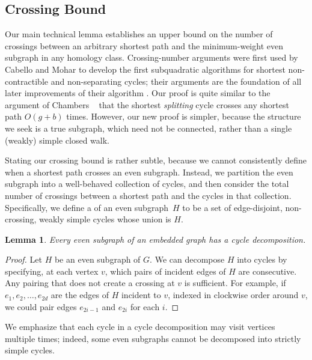 \documentclass{sig-alternate}
\def\note#1{\EMPH{\color{red} #1}}
\newtheorem{lemma}[theorem]{Lemma}
\begin{document}
\subsection{Crossing Bound}

Our main technical lemma establishes an upper bound on the number of crossings between an arbitrary shortest path and the minimum-weight even subgraph in any homology class.  Crossing-number arguments were first used by Cabello and Mohar \cite{cm-fsnsn-07} to develop the first subquadratic algorithms for shortest non-contractible and non-separating cycles; their arguments are the foundation of all later improvements of their algorithm \cite{c-mdpg-06, k-csnco-06, cc-msspg-07}.  Our proof is quite similar to the argument of Chambers \etal~\cite{ccelw-scsih-08} that the shortest \emph{splitting} cycle crosses any shortest path $O(g+b)$ times.  However, our new proof is simpler, because the structure we seek is a true subgraph, which need not be connected, rather than a single (weakly) simple closed walk.

Stating our crossing bound is rather subtle, because we cannot consistently define when a shortest path crosses an even subgraph.  Instead, we partition the even subgraph into a well-behaved collection of cycles, and then consider the total number of crossings between a shortest path and the cycles in that collection.  Specifically, we define a  of an even subgraph~$H$ to be a set of edge-disjoint, non-crossing, weakly simple cycles whose union is $H$.

\begin{lemma}
Every even subgraph of an embedded graph has a cycle decomposition.
\end{lemma}

\begin{proof}
Let $H$ be an even subgraph of $G$.  We can decompose $H$ into cycles by specifying, at each vertex $v$, which pairs of incident edges of $H$ are consecutive.  Any pairing that does not create a crossing at $v$ is sufficient.  For example, if $e_1, e_2, \dots, e_{2d}$ are the edges of $H$ incident to $v$, indexed in clockwise order around $v$, we could pair edges $e_{2i-1}$ and $e_{2i}$ for each $i$.  
\end{proof}

We emphasize that each cycle in a cycle decomposition may visit vertices multiple times; indeed, some even subgraphs cannot be decomposed into strictly simple cycles.

\end{document}
